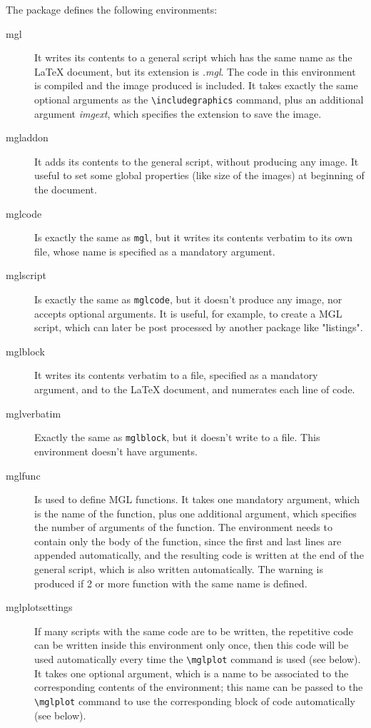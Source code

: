 \documentclass[12pt]{article}
\begin{document}
The package defines the following environments:
\begin{description}
\item[mgl]
	It writes its contents to a general script which has the same name as the LaTeX document, but its extension is \emph{.mgl}. The code in this environment is compiled and the image produced is included. It takes exactly the same optional arguments as the \texttt{\textbackslash{}includegraphics} command, plus an additional argument \emph{imgext}, which specifies the extension to save the image.
\item[mgladdon]
	It adds its contents to the general script, without producing any image. It useful to set some global properties (like size of the images) at beginning of the document.
\item[mglcode]
	Is exactly the same as \texttt{mgl}, but it writes its contents verbatim to its own file, whose name is specified as a mandatory argument.
\item[mglscript]
	Is exactly the same as \texttt{mglcode}, but it doesn't produce any image, nor accepts optional arguments. It is useful, for example, to create a MGL script, which can later be post processed by another package like "listings".
\item[mglblock]
	It writes its contents verbatim to a file, specified as a mandatory argument, and to the LaTeX document, and numerates each line of code.

\item[mglverbatim]
	Exactly the same as \texttt{mglblock}, but it doesn't write to a file. This environment doesn't have arguments.
\item[mglfunc]
	Is used to define MGL functions. It takes one mandatory argument, which is the name of the function, plus one additional argument, which specifies the number of arguments of the function. The environment needs to contain only the body of the function, since the first and last lines are appended automatically, and the resulting code is written at the end of the general script, which is also written automatically. The warning is produced if 2 or more function with the same name is defined.
\item[mglplotsettings]
	If many scripts with the same code are to be written, the repetitive code can be written inside this environment only once, then this code will be used automatically every time the \texttt{\textbackslash{}mglplot} command is used (see below). It takes one optional argument, which is a name to be associated to the corresponding contents of the environment; this name can be passed to the \texttt{\textbackslash{}mglplot} command to use the corresponding block of code automatically (see below).
\end{description}
\end{document}
